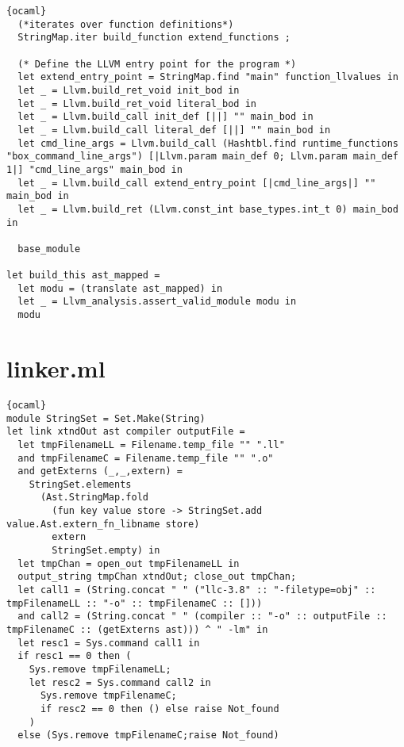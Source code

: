 \begin{lstlisting}{ocaml}
  (*iterates over function definitions*)
  StringMap.iter build_function extend_functions ;

  (* Define the LLVM entry point for the program *)
  let extend_entry_point = StringMap.find "main" function_llvalues in
  let _ = Llvm.build_ret_void init_bod in
  let _ = Llvm.build_ret_void literal_bod in
  let _ = Llvm.build_call init_def [||] "" main_bod in
  let _ = Llvm.build_call literal_def [||] "" main_bod in
  let cmd_line_args = Llvm.build_call (Hashtbl.find runtime_functions "box_command_line_args") [|Llvm.param main_def 0; Llvm.param main_def 1|] "cmd_line_args" main_bod in
  let _ = Llvm.build_call extend_entry_point [|cmd_line_args|] "" main_bod in
  let _ = Llvm.build_ret (Llvm.const_int base_types.int_t 0) main_bod in

  base_module

let build_this ast_mapped =
  let modu = (translate ast_mapped) in
  let _ = Llvm_analysis.assert_valid_module modu in
  modu
\end{lstlisting}
\section{linker.ml}
\begin{lstlisting}{ocaml}
module StringSet = Set.Make(String)
let link xtndOut ast compiler outputFile =
  let tmpFilenameLL = Filename.temp_file "" ".ll"
  and tmpFilenameC = Filename.temp_file "" ".o"
  and getExterns (_,_,extern) =
    StringSet.elements
      (Ast.StringMap.fold
        (fun key value store -> StringSet.add value.Ast.extern_fn_libname store)
        extern
        StringSet.empty) in
  let tmpChan = open_out tmpFilenameLL in
  output_string tmpChan xtndOut; close_out tmpChan;
  let call1 = (String.concat " " ("llc-3.8" :: "-filetype=obj" :: tmpFilenameLL :: "-o" :: tmpFilenameC :: []))
  and call2 = (String.concat " " (compiler :: "-o" :: outputFile :: tmpFilenameC :: (getExterns ast))) ^ " -lm" in
  let resc1 = Sys.command call1 in
  if resc1 == 0 then (
    Sys.remove tmpFilenameLL;
    let resc2 = Sys.command call2 in
      Sys.remove tmpFilenameC;
      if resc2 == 0 then () else raise Not_found
    )
  else (Sys.remove tmpFilenameC;raise Not_found)
\end{lstlisting}
